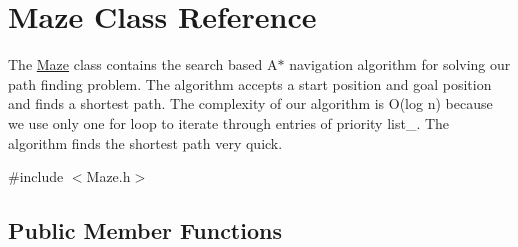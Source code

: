 \hypertarget{class_maze}{}\section{Maze Class Reference}
\label{class_maze}


The \mbox{\hyperlink{class_maze}{Maze}} class contains the search based A$\ast$ navigation algorithm for solving our path finding problem. The algorithm accepts a start position and goal position and finds a shortest path. The complexity of our algorithm is O(log n) because we use only one for loop to iterate through entries of priority list\+\_\+. The algorithm finds the shortest path very quick.  




{\ttfamily \#include $<$Maze.\+h$>$}

\subsection*{Public Member Functions}
